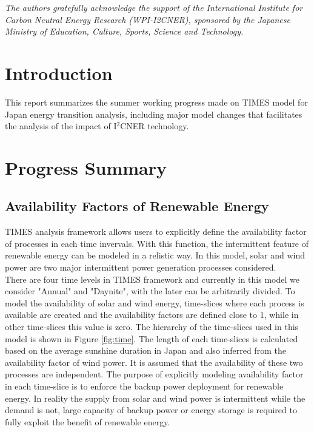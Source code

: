 \documentclass[14pt,a4paper]{article} %
\begin{document}
\begin{titlepage}

    \textit{The authors gratefully acknowledge the support of the International Institute for Carbon
Neutral Energy Research (WPI-I2CNER), sponsored by the Japanese Ministry of Education, Culture, Sports, Science and Technology.}  

\end{titlepage}

\section{Introduction}
This report summarizes the summer working progress made on TIMES model for Japan energy transition analysis, including major model changes that facilitates the analysis of the impact of I$^2$CNER technology.

\section{Progress Summary}
\subsection{Availability Factors of Renewable Energy}
TIMES analysis framework allows users to explicitly define the availability factor of processes in each time invervals. With this function, the intermittent feature of renewable energy can be modeled in a relistic way. In this model, solar and wind power are two major intermittent power generation processes considered.\\
There are four time levels in TIMES framework and currently in this model we consider "Annual" and "Daynite", with the later can be arbitrarily divided. To model the availability of solar and wind energy, time-slices where each process is available are created and the availability factors are defined close to 1, while in other time-slices this value is zero. The hierarchy of the time-slices used in this model is shown in Figure \ref{fig:time}. The length of each time-slices is calculated based on the average sunshine duration in Japan and also inferred from the availability factor of wind power. It is assumed that the availability of these two processes are independent. 
The purpose of explicitly modeling availability factor in each time-slice is to enforce the backup power deployment for renewable energy. In reality the supply from solar and wind power is intermittent while the demand is not, large capacity of backup power or energy storage is required to fully exploit the benefit of renewable energy.
\end{document}
